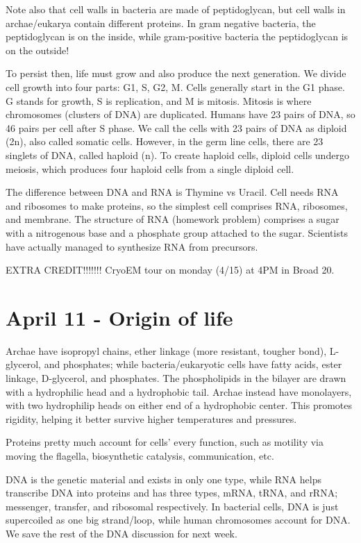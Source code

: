 \documentclass[12pt]{article}
\begin{document}
Note also that cell walls in bacteria are made of peptidoglycan, but cell walls in archae/eukarya contain different proteins. In gram negative bacteria, the peptidoglycan is on the inside, while gram-positive bacteria the peptidoglycan is on the outside! 

To persist then, life must grow and also produce the next generation. We divide cell growth into four parts: G1, S, G2, M. Cells generally start in the G1 phase. G stands for growth, S is replication, and M is mitosis. Mitosis is where chromosomes (clusters of DNA) are duplicated. Humans have 23 pairs of DNA, so 46 pairs per cell after S phase. We call the cells with 23 pairs of DNA as diploid (2n), also called somatic cells. However, in the germ line cells, there are 23 singlets of DNA, called haploid (n). To create haploid cells, diploid cells undergo meiosis, which produces four haploid cells from a single diploid cell. 

The difference between DNA and RNA is Thymine vs Uracil. Cell needs RNA and ribosomes to make proteins, so the simplest cell comprises RNA, ribosomes, and membrane. The structure of RNA (homework problem) comprises a sugar with a nitrogenous base and a phosphate group attached to the sugar. Scientists have actually managed to synthesize RNA from precursors. 

EXTRA CREDIT!!!!!!! CryoEM tour on monday (4/15) at 4PM in Broad 20. 

\section*{April 11 - Origin of life}

Archae have isopropyl chains, ether linkage (more resistant, tougher bond), L-glycerol, and phosphates; while bacteria/eukaryotic cells have fatty acids, ester linkage, D-glycerol, and phosphates. The phospholipids in the bilayer are drawn with a hydrophilic head and a hydrophobic tail. Archae instead have monolayers, with two hydrophilip heads on either end of a hydrophobic center. This promotes rigidity, helping it better survive higher temperatures and pressures. 

Proteins pretty much account for cells' every function, such as motility via moving the flagella, biosynthetic catalysis, communication, etc.

DNA is the genetic material and exists in only one type, while RNA helps transcribe DNA into proteins and has three types, mRNA, tRNA, and rRNA; messenger, transfer, and ribosomal respectively. In bacterial cells, DNA is just supercoiled as one big strand/loop, while human chromosomes account for DNA. We save the rest of the DNA discussion for next week.
\end{document}
